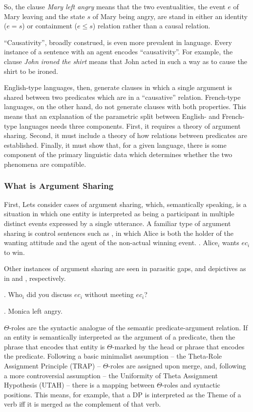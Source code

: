 \documentclass[letterpaper,12pt]{article}
\begin{document}
So, the clause \textit{Mary left angry} means that the two eventualities, the event $e$ of Mary leaving and the state $s$ of Mary being angry, are stand in either an identity ($e=s$) or containment ($e\leq s$) relation rather than a causal relation.

``Causativity'', broadly construed, is even more prevalent in language.
Every instance of a sentence with an agent encodes ``causativity''.
For example, the clause \textit{John ironed the shirt} means that John acted in such a way as to cause the shirt to be ironed.

English-type languages, then, generate clauses in which a single argument is shared between two predicates which are in a ``causative'' relation.
French-type languages, on the other hand, do not generate clauses with both properties.
This means that an explanation of the parametric split between English- and French-type languages needs three components.
First, it requires a theory of argument sharing.
Second, it must include a theory of how relations between predicates are established.
Finally, it must show that, for a given language, there is some component of the primary linguistic data which determines whether the two phenomena are compatible.

\subsubsection{What is Argument Sharing}
First, Lets consider cases of argument sharing, which, semantically speaking, is a situation in which one entity is interpreted as being a participant in multiple distinct events expressed by a single utterance.
A familiar type of argument sharing is control sentences such as \Next, in which Alice is both the holder of the wanting attitude and the agent of the non-actual winning event.
\ex.\label{ex:Control} Alice$_i$ wants $ec_i$ to win.

Other instances of argument sharing are seen in parasitic gaps, and depictives as in \Next and \NNext, respectively.

\ex. Who$_i$ did you discuss $ec_i$ without meeting $ec_i$?

\ex. Monica left angry.

$\Theta$-roles are the syntactic analogue of the semantic predicate-argument relation.
If an entity is semantically interpreted as the argument of a predicate, then the phrase that encodes that entity is $\Theta$-marked by the head or phrase that encodes the predicate.
Following a basic minimalist assumption -- the Theta-Role Assignment Principle (TRAP) \parencite{hornsteinetal2005understanding} -- $\Theta$-roles are assigned upon merge, and, following a more controversial assumption -- the Uniformity of Theta Assignment Hypothesis (UTAH) \parencite{baker1988incorporation}-- there is a mapping between $\Theta$-roles and syntactic positions.
This means, for example, that a DP is interpreted as the Theme of a verb iff it is merged as the complement of that verb.
\end{document}
